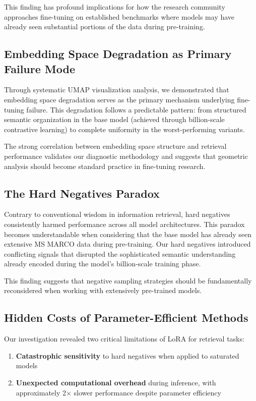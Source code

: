 This finding has profound implications for how the research community approaches fine-tuning on established benchmarks where models may have already seen substantial portions of the data during pre-training.

\subsection{Embedding Space Degradation as Primary Failure Mode}

Through systematic UMAP visualization analysis, we demonstrated that embedding space degradation serves as the primary mechanism underlying fine-tuning failure. This degradation follows a predictable pattern: from structured semantic organization in the base model (achieved through billion-scale contrastive learning) to complete uniformity in the worst-performing variants.

The strong correlation between embedding space structure and retrieval performance validates our diagnostic methodology and suggests that geometric analysis should become standard practice in fine-tuning research.

\subsection{The Hard Negatives Paradox}

Contrary to conventional wisdom in information retrieval, hard negatives consistently harmed performance across all model architectures. This paradox becomes understandable when considering that the base model has already seen extensive MS MARCO data during pre-training. Our hard negatives introduced conflicting signals that disrupted the sophisticated semantic understanding already encoded during the model's billion-scale training phase.

This finding suggests that negative sampling strategies should be fundamentally reconsidered when working with extensively pre-trained models.

\subsection{Hidden Costs of Parameter-Efficient Methods}

Our investigation revealed two critical limitations of LoRA for retrieval tasks:
\begin{enumerate}
\item \textbf{Catastrophic sensitivity} to hard negatives when applied to saturated models
\item \textbf{Unexpected computational overhead} during inference, with approximately 2× slower performance despite parameter efficiency
\end{enumerate}

